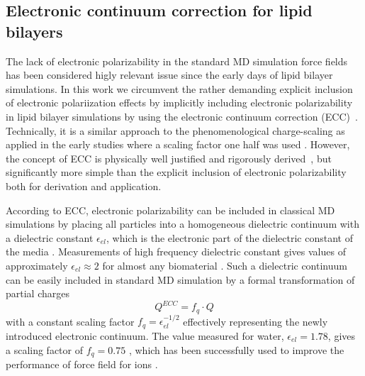 \documentclass[aip,jcp,twocolumn]{revtex4}
\begin{document}
\subsection{Electronic continuum correction for lipid bilayers}\label{section:ecc}
The lack of electronic polarizability in the standard MD simulation
force fields has been considered higly relevant issue since the early days of
lipid bilayer simulations.
In this work we circumvent the rather demanding explicit inclusion
of electronic polariization effects \cite{chowdhary13} by implicitly including
electronic polarizability in lipid
bilayer simulations by using the electronic continuum correction
(ECC)~\cite{leontyev11}. 
Technically, it is a similar approach to the phenomenological charge-scaling as applied in 
the early studies where a scaling factor one half was used \cite{jonsson86,egberts94}. 
However, the concept of ECC is 
physically well justified and rigorously derived~\cite{leontyev09, leontyev10, leontyev11},
but significantly more simple than the explicit inclusion of electronic
polarizability \cite{chowdhary13} both for derivation and application.


According to ECC, electronic
polarizability can be included in classical MD simulations by
placing all particles into a homogeneous dielectric continuum 
with a dielectric constant $\epsilon _{el}$, 
which is the electronic part of the dielectric constant of 
the media \cite{leontyev11}. Measurements of high frequency 
dielectric constant gives values of approximately $\epsilon _{el} \approx 2$ 
for almost any biomaterial \cite{some_original_work, leontyev11}.
Such a dielectric continuum can be easily included in standard MD simulation by
a formal transformation of partial charges 
\begin{equation}
  Q^{ECC} = f_q \cdot Q
\end{equation}
with a constant scaling factor $f_q = \epsilon _{el} ^{-1/2}$ 
effectively representing the newly introduced electronic continuum. 
The value measured for water, $\epsilon _{el} = 1.78$, gives 
a scaling factor of $f_q = 0.75$ \cite{some_orig_source, leontyev11}, which has been
successfully used to improve the performance of force field for ions \cite{kohagen14,kohagen16,??}. 
\end{document}
